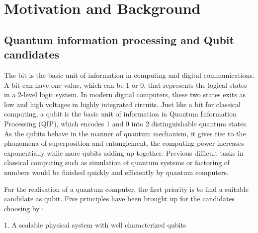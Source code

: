 
\chapter[Motivation and Background]
{Motivation and Background} %

\label{Chapter1} %







\newcommand{\keyword}[1]{\textbf{#1}}
\newcommand{\tabhead}[1]{\textbf{#1}}
\newcommand{\code}[1]{\texttt{#1}}
\newcommand{\file}[1]{\texttt{\bfseries#1}}
\newcommand{\option}[1]{\texttt{\itshape#1}}


\section[Quantum information processing and Qubit candidates]{Quantum information processing and Qubit candidates}

The bit is the basic unit of information in computing and digital communications. A bit can have one value, which can be 1 or 0, that represents the logical states in a 2-level logic system. In modern digital computers, these two states exits as low and high voltages in highly integrated circuits. Just like a bit for classical computing, a qubit is the basic unit of information in Quantum Information Processing (QIP), which encodes 1 and 0 into 2 distinguishable quantum states. As the qubits behave in the manner of quantum mechanism, it gives rise to the phonomena of superposition and entanglement, the computing power increases exponentially while more qubits adding up together. Previous difficult tasks in classical computing such as simulation of quantum systems or factoring of numbers would be finished quickly and efficiently by quantum computers.

For the realisation of a quantum computer,  the first priority is to find a suitable candidate as qubit. Five principles have been brought up for the candidates choosing by \citep{divincenzo_physical_2000}:

1. A scalable physical system with well characterized qubits

